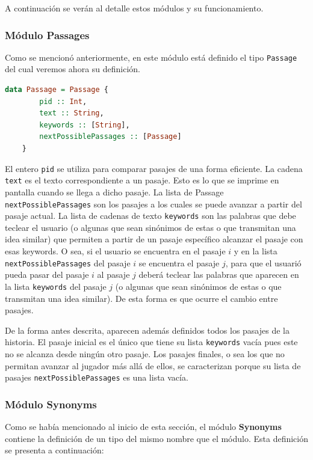 \documentclass[12pt]{article}
\begin{document}
A continuación se verán al detalle estos módulos y su funcionamiento.

\subsubsection{Módulo Passages}

Como se mencionó anteriormente, en este módulo está definido el tipo \verb|Passage| del cual veremos ahora su definición.

\begin{lstlisting}[language=Haskell, morekeywords={fix}]
data Passage = Passage {
        pid :: Int, 
        text :: String, 
        keywords :: [String], 
        nextPossiblePassages :: [Passage]
    }
\end{lstlisting}


El entero \verb|pid| se utiliza para comparar pasajes de una forma eficiente. La cadena \verb|text| es el texto correspondiente a un pasaje. Esto es lo que se imprime en pantalla cuando se llega a dicho pasaje. La lista de Passage \verb|nextPossiblePassages| son los pasajes a los cuales se puede avanzar a partir del pasaje actual. La lista de cadenas de texto \verb|keywords| son las palabras que debe teclear el usuario (o algunas que sean sinónimos de estas o que transmitan una idea similar) que permiten a partir de un pasaje específico alcanzar el pasaje con esas keywords. O sea, si  el usuario se encuentra en el pasaje $i$ y en la lista \verb|nextPossiblePassages| del pasaje $i$ se encuentra el pasaje $j$, para que el usuarió pueda pasar del pasaje $i$ al pasaje $j$ deberá teclear las palabras que aparecen en la lista \verb|keywords| del pasaje $j$ (o algunas que sean sinónimos de estas o que transmitan una idea similar). De esta forma es que ocurre el cambio entre pasajes.

De la forma antes descrita, aparecen además definidos todos los pasajes de la historia. El pasaje inicial es el único que tiene su lista \verb|keywords| vacía pues este no se alcanza desde ningún otro pasaje. Los pasajes finales, o sea los que no permitan avanzar al jugador más allá de ellos, se caracterizan porque su lista de pasajes \verb|nextPossiblePassages|  es una lista vacía.

\subsubsection{Módulo Synonyms}

Como se había mencionado al inicio de esta sección, el módulo \textbf{Synonyms} contiene la definición de un tipo del mismo nombre que el módulo. Esta definición se presenta a continuación:
\end{document}
